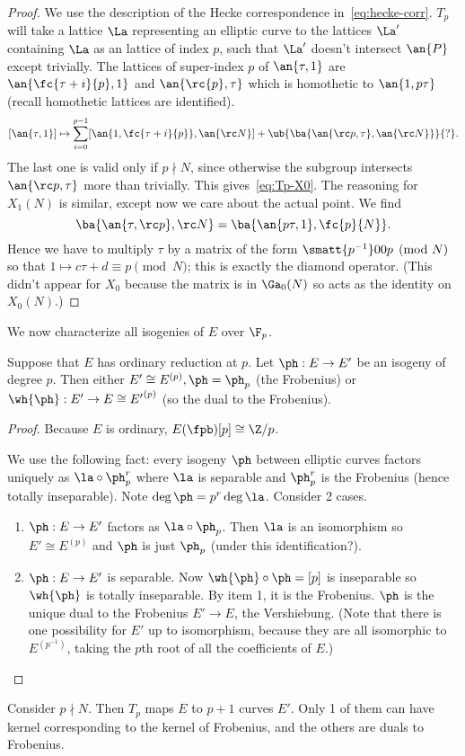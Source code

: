 \begin{proof}
We use the description of the Hecke correspondence in~\eqref{eq:hecke-corr}. $T_p$ will take a lattice $\La$ representing an elliptic curve to the lattices $\La'$ containing $\La$ as an lattice of index $p$, such that $\La'$ doesn't intersect $\an{P}$ except trivially. The lattices of super-index $p$ of $\an{\tau,1}$ are $\an{\fc{\tau+i}{p},1}$ and $\an{\rc{p},\tau}$ which is homothetic to $\an{1,p\tau}$ (recall homothetic lattices are identified).
\[
[\an{\tau,1}]\mapsto \sum_{i=0}^{p-1} [\an{1,\fc{\tau+i}{p}},\an{\rc N}]+\ub{\ba{\an{\rc p,\tau},\an{\rc N}}}{?}.
\]
The last one is valid only if $p\nmid N$, since otherwise the subgroup intersects $\an{\rc p,\tau}$ more than trivially. This gives~\eqref{eq:Tp-X0}. The reasoning for $X_1(N)$ is similar, except now we care about the actual point. We find
\[
\ba{\an{\tau,\rc p},{\rc N}}=\ba{\an{p\tau, 1},\fc{p}{N}}.
\]
Hence we have to multiply $\tau$ by a matrix of the form $\smatt {p^{-1}}00p\pmod N$ so that $1\mapsto c\tau+d\equiv p\pmod N$; this is exactly the diamond operator. (This didn't appear for $X_0$ because the matrix is in $\Ga_0(N)$ so acts as the identity on $X_0(N)$.) 
\end{proof}
We now characterize all isogenies of $E$ over $\F_p$.
\begin{pr}
Suppose that $E$ has ordinary reduction at $p$. Let $\ph:E\to E'$ be an isogeny of degree $p$. Then either $E'\cong E^{(p)},\ph=\ph_p$ (the Frobenius) or $\wh{\ph}:E'\to E\cong {E'}^{(p)}$ (so the dual to the Frobenius). 
\end{pr}
\begin{proof}
Because $E$ is ordinary, $E(\fpb)[p]\cong \Z/p$. 

We use the following fact: every isogeny $\ph$ between elliptic curves factors uniquely as $\la \circ \ph_p^r$ where $\la$ is separable and $\ph_p^r$ is the Frobenius (hence totally inseparable). Note $\deg\ph=p^r\deg\la$. Consider 2 cases.
\begin{enumerate}
\item
$\ph: E\to E'$ factors as $\la\circ \ph_p$. Then $\la$ is an isomorphism so $E'\cong E^{(p)}$ and $\ph$ is just $\ph_p$ (under this identification?).
\item
$\ph: E\to E'$ is separable. Now $\wh{\ph}\circ \ph=[p]$ is inseparable so $\wh{\ph}$ is totally inseparable. By item 1, it is the Frobenius. $\ph$ is the unique dual to the Frobenius $E'\to E$, the Vershiebung. (Note that there is one possibility for $E'$ up to isomorphism, because they are all isomorphic to $E^{(p^{-1})}$, taking the $p$th root of all the coefficients of $E$.)
\end{enumerate}
\end{proof}
Consider $p\nmid N$. Then $T_p$ maps $E$ to $p+1$ curves $E'$. Only 1 of them can have kernel corresponding to the kernel of Frobenius, and the others are duals to Frobenius. 

